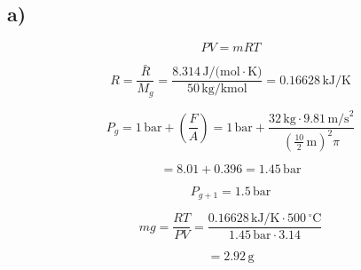 

\subsection*{a)}

\[
PV = mRT
\]

\[
R = \frac{\bar{R}}{M_g} = \frac{8.314 \, \text{J/(mol} \cdot \text{K)}}{50 \, \text{kg/kmol}} = 0.16628 \, \text{kJ/K}
\]

\[
P_g = 1 \, \text{bar} + \left( \frac{F}{A} \right) = 1 \, \text{bar} + \frac{32 \, \text{kg} \cdot 9.81 \, \text{m/s}^2}{\left( \frac{10}{2} \, \text{m} \right)^2 \pi}
\]

\[
= 8.01 + 0.396 = 1.45 \, \text{bar}
\]

\[
P_{g+1} = 1.5 \, \text{bar}
\]

\[
mg = \frac{RT}{PV} = \frac{0.16628 \, \text{kJ/K} \cdot 500 \, ^\circ\text{C}}{1.45 \, \text{bar} \cdot 3.14}
\]

\[
= 2.92 \, \text{g}
\]